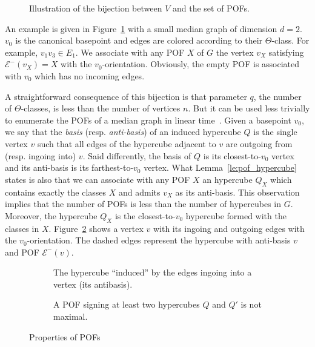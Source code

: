 \documentclass[a4paper,UKenglish,numberwithinsect,cleveref, autoref,anonymous]{lipics-v2021}
\begin{document}
\begin{figure}[h]
\centering
\scalebox{0.95}{}
\caption{Illustration of the bijection between $V$ and the set of POFs.}
\label{fig:vertices_pof}
\end{figure}

An example is given in Figure~\ref{fig:vertices_pof} with a small median graph of dimension $d=2$. $v_0$ is the canonical basepoint  and edges are colored according to  their $\Theta$-class. For example, $v_1v_3 \in E_1$. We associate with any POF $X$ of $G$ the vertex $v_X$ satisfying $\mathcal{E}^-(v_X) = X$ with the $v_0$-orientation. Obviously, the empty POF is associated with $v_0$ which has no incoming edges.

A straightforward consequence of this bijection is that parameter $q$, the number of $\Theta$-classes, is less than the number of vertices $n$. But it can be used less trivially to enumerate the POFs of a median graph in linear time~\cite{BaQuSaMa02,Ko09}. Given a basepoint $v_0$, we say that the \textit{basis} (resp. \textit{anti-basis}) of an induced hypercube $Q$ is the single vertex $v$ such that all edges of the hypercube adjacent to $v$ are outgoing from (resp. ingoing into) $v$. Said differently, the basis of $Q$ is its closest-to-$v_0$ vertex and its anti-basis is its farthest-to-$v_0$ vertex. What Lemma~\ref{le:pof_hypercube} states is also that we can associate with any POF $X$ an hypercube $Q_X$ which contains exactly the classes $X$ and admits $v_X$ as its anti-basis. This observation implies that the number of POFs is less than the number of hypercubes in $G$. Moreover, the hypercube $Q_X$ is the closest-to-$v_0$ hypercube formed with the classes in $X$. Figure~\ref{subfig:ingoing_edges} shows a vertex $v$ with its ingoing and outgoing edges with the $v_0$-orientation. The dashed edges represent the hypercube with anti-basis $v$ and POF $\mathcal{E}^-(v)$.

\begin{figure}[h]
\begin{subfigure}[b]{0.49\columnwidth}
\centering
\scalebox{0.8}{}
\caption{The hypercube ``induced'' by the edges ingoing into a vertex (its antibasis).}
\label{subfig:ingoing_edges}
\end{subfigure}
\begin{subfigure}[b]{0.49\columnwidth}
\centering
\scalebox{0.8}{}
\caption{A POF signing at least two hypercubes $Q$ and $Q'$ is not maximal.}
\label{subfig:maximal_pof}
\end{subfigure}
\caption{Properties of POFs}
\label{fig:properties_pofs}
\end{figure} 
\end{document}
